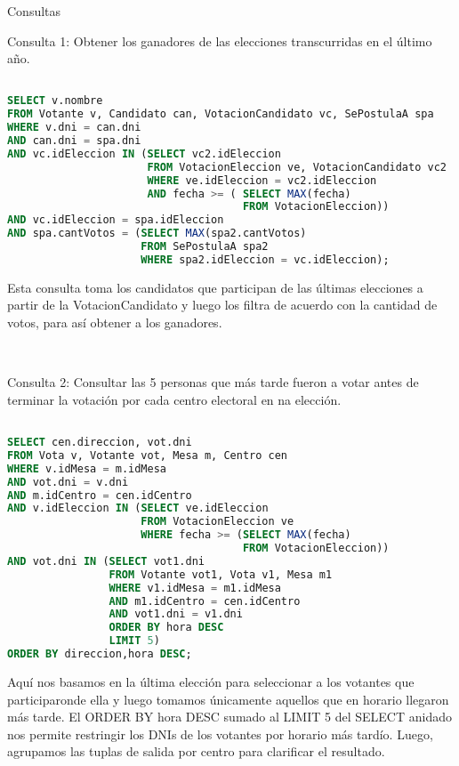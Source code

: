 \begin{section}{Consultas}


\noindent Consulta 1: Obtener los ganadores de las elecciones transcurridas en el \'ultimo año.

\begin{lstlisting}[language=SQL, basicstyle=\footnotesize]

SELECT v.nombre
FROM Votante v, Candidato can, VotacionCandidato vc, SePostulaA spa
WHERE v.dni = can.dni
AND can.dni = spa.dni
AND vc.idEleccion IN (SELECT vc2.idEleccion
                      FROM VotacionEleccion ve, VotacionCandidato vc2
                      WHERE ve.idEleccion = vc2.idEleccion
                      AND fecha >= ( SELECT MAX(fecha)
                                     FROM VotacionEleccion))
AND vc.idEleccion = spa.idEleccion
AND spa.cantVotos = (SELECT MAX(spa2.cantVotos)
                     FROM SePostulaA spa2
                     WHERE spa2.idEleccion = vc.idEleccion);


\end{lstlisting} 
Esta consulta toma los candidatos que participan de las \'ultimas elecciones a partir de la VotacionCandidato y luego los filtra de acuerdo con la cantidad de votos, para as\'i obtener a los ganadores.

~

\noindent Consulta 2: Consultar las 5 personas que m\'as tarde fueron a votar antes de terminar la votaci\'on por cada centro electoral en na elecci\'on.

\begin{lstlisting}[language=SQL, basicstyle=\footnotesize]

SELECT cen.direccion, vot.dni
FROM Vota v, Votante vot, Mesa m, Centro cen
WHERE v.idMesa = m.idMesa
AND vot.dni = v.dni
AND m.idCentro = cen.idCentro
AND v.idEleccion IN (SELECT ve.idEleccion
                     FROM VotacionEleccion ve
                     WHERE fecha >= (SELECT MAX(fecha)
                                     FROM VotacionEleccion))
AND vot.dni IN (SELECT vot1.dni
                FROM Votante vot1, Vota v1, Mesa m1
                WHERE v1.idMesa = m1.idMesa
                AND m1.idCentro = cen.idCentro
                AND vot1.dni = v1.dni
                ORDER BY hora DESC
                LIMIT 5)
ORDER BY direccion,hora DESC;

\end{lstlisting} 

Aqu\'i nos basamos en la \'ultima elecci\'on para seleccionar a los votantes que participaronde ella y luego tomamos \'unicamente aquellos que en horario llegaron m\'as tarde. El ORDER BY hora DESC sumado al LIMIT 5 del SELECT anidado nos permite restringir los DNIs de los votantes por horario m\'as tard\'io. Luego, agrupamos las tuplas de salida por centro para clarificar el resultado.


\end{section}
